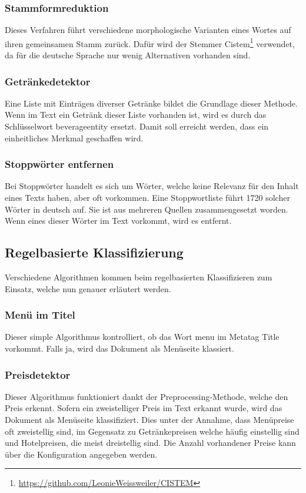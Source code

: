 \subsubsection{Stammformreduktion}
Dieses Verfahren führt verschiedene morphologische Varianten eines Wortes auf ihren gemeinsamen Stamm zurück.
Dafür wird der Stemmer \glqq Cistem\footnote{\url{https://github.com/LeonieWeissweiler/CISTEM}}\grqq{} verwendet, da für die deutsche Sprache nur wenig Alternativen vorhanden sind. 
\subsubsection{Getränkedetektor}
Eine Liste mit Einträgen diverser Getränke bildet die Grundlage dieser Methode.
Wenn im Text ein Getränk dieser Liste vorhanden ist, wird es durch das Schlüsselwort \glqq beverageentity\grqq{} ersetzt.
Damit soll erreicht werden, dass ein einheitliches Merkmal geschaffen wird.
\subsubsection{Stoppwörter entfernen}
Bei Stoppwörter handelt es sich um Wörter, welche keine Relevanz für den Inhalt eines Texts haben, aber oft vorkommen.
Eine Stoppwortliste führt 1720 solcher Wörter in deutsch auf. Sie ist aus mehreren Quellen zusammengesetzt worden.
Wenn eines dieser Wörter im Text vorkommt, wird es entfernt.
\subsection{Regelbasierte Klassifizierung}
Verschiedene Algorithmen kommen beim regelbasierten Klassifizieren zum Einsatz, welche nun genauer erläutert werden.
\subsubsection{Menü im Titel}
Dieser simple Algorithmus kontrolliert, ob das Wort \glqq menu\grqq{} im Metatag \glqq Title\grqq{} vorkommt.
Falls ja, wird das Dokument als Menüseite klassiert.
\subsubsection{Preisdetektor}
Dieser Algorithmus funktioniert dankt der Preprocessing-Methode, welche den Preis erkennt.
Sofern ein zweistelliger Preis im Text erkannt wurde, wird das Dokument als Menüseite klassifiziert. Dies unter der Annahme, dass Menüpreise oft zweistellig sind, im Gegensatz zu Getränkepreisen welche häufig einstellig sind und Hotelpreisen, die meist dreistellig sind.
Die Anzahl vorhandener Preise kann über die Konfiguration angegeben werden.
